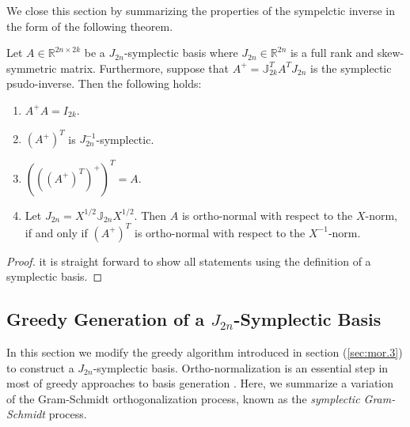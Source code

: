 We close this section by summarizing the properties of the sympelctic inverse in the form of the following theorem.
\begin{theorem}
Let $A\in \mathbb R^{2n\times 2k}$ be a $J_{2n}$-symplectic basis where $J_{2n}\in\mathbb R^{2n}$ is a full rank and skew-symmetric matrix. Furthermore, suppose that $A^{+} = \mathbb{J}_{2k}^T A^T J_{2n}$ is the symplectic psudo-inverse. Then the following holds:
\begin{enumerate}
\item $A^+A = I_{2k}$.
\item $(A^+)^T$ is $J_{2n}^{-1}$-symplectic.
\item $\left(\left(\left(A^+\right)^T\right)^+\right)^T = A$.
\item Let $J_{2n}=X^{1/2}\mathbb J_{2n} X^{1/2}$. Then $A$ is ortho-normal with respect to the $X$-norm, if and only if $(A^+)^T$ is ortho-normal with respect to the $X^{-1}$-norm.
\end{enumerate}
\end{theorem}
\begin{proof}
it is straight forward to show all statements using the definition of a symplectic basis.
\end{proof}

\subsection{Greedy Generation of a $J_{2n}$-Symplectic Basis} \label{sec:normmor.2}
In this section we modify the greedy algorithm introduced in section (\ref{sec:mor.3}) to construct a $J_{2n}$-symplectic basis. Ortho-normalization is an essential step in most of greedy approaches to basis generation \cite{hesthaven2015certified,quarteroni2015reduced}. Here, we summarize a variation of the Gram-Schmidt orthogonalization process, known as the \emph{symplectic Gram-Schmidt} process.

